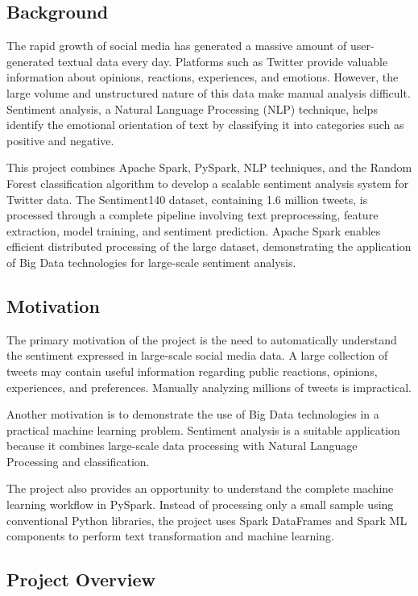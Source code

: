 \documentclass[12pt,a4paper]{article}
\begin{document}
\subsection{Background}

The rapid growth of social media has generated a massive amount of user-generated textual data every day. Platforms such as Twitter provide valuable information about opinions, reactions, experiences, and emotions. However, the large volume and unstructured nature of this data make manual analysis difficult. Sentiment analysis, a Natural Language Processing (NLP) technique, helps identify the emotional orientation of text by classifying it into categories such as positive and negative.

This project combines Apache Spark, PySpark, NLP techniques, and the Random Forest classification algorithm to develop a scalable sentiment analysis system for Twitter data. The Sentiment140 dataset, containing 1.6 million tweets, is processed through a complete pipeline involving text preprocessing, feature extraction, model training, and sentiment prediction. Apache Spark enables efficient distributed processing of the large dataset, demonstrating the application of Big Data technologies for large-scale sentiment analysis.


\subsection{Motivation}

The primary motivation of the project is the need to automatically understand the sentiment expressed in large-scale social media data. A large collection of tweets may contain useful information regarding public reactions, opinions, experiences, and preferences. Manually analyzing millions of tweets is impractical.

Another motivation is to demonstrate the use of Big Data technologies in a practical machine learning problem. Sentiment analysis is a suitable application because it combines large-scale data processing with Natural Language Processing and classification.

The project also provides an opportunity to understand the complete machine learning workflow in PySpark. Instead of processing only a small sample using conventional Python libraries, the project uses Spark DataFrames and Spark ML components to perform text transformation and machine learning.



\subsection{Project Overview}
\end{document}
